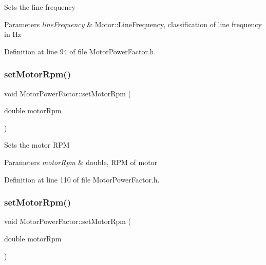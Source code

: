 Sets the line frequency 
\begin{DoxyParams}{Parameters}
{\em line\+Frequency} & Motor\+::\+Line\+Frequency, classification of line frequency in Hz \\
\hline
\end{DoxyParams}


Definition at line 94 of file Motor\+Power\+Factor.\+h.

\mbox{\label{class_motor_power_factor_a4154bf52c6c9c9e5fb2f0985d7ae3531}} 
\subsubsection{\texorpdfstring{set\+Motor\+Rpm()}{setMotorRpm()}\hspace{0.1cm}{\footnotesize\ttfamily [1/3]}}
{\footnotesize\ttfamily void Motor\+Power\+Factor\+::set\+Motor\+Rpm (\begin{DoxyParamCaption}\item[{double}]{motor\+Rpm }\end{DoxyParamCaption})\hspace{0.3cm}{\ttfamily [inline]}}

Sets the motor R\+PM 
\begin{DoxyParams}{Parameters}
{\em motor\+Rpm} & double, R\+PM of motor \\
\hline
\end{DoxyParams}


Definition at line 110 of file Motor\+Power\+Factor.\+h.

\mbox{\label{class_motor_power_factor_a4154bf52c6c9c9e5fb2f0985d7ae3531}} 
\subsubsection{\texorpdfstring{set\+Motor\+Rpm()}{setMotorRpm()}\hspace{0.1cm}{\footnotesize\ttfamily [2/3]}}
{\footnotesize\ttfamily void Motor\+Power\+Factor\+::set\+Motor\+Rpm (\begin{DoxyParamCaption}\item[{double}]{motor\+Rpm }\end{DoxyParamCaption})\hspace{0.3cm}{\ttfamily [inline]}}

